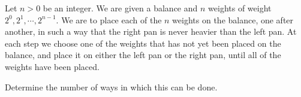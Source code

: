 Let 
$n > 0$
 be an integer. We are given a balance and 
$n$
 weights of weight 
$2^0, 2^1, \cdots, 2^{n-1}$.
 We are to place each of the 
$n$
 weights on the balance, one after another, in such a way that the right pan is never heavier than the left pan. At each step we choose one of the weights that has not yet been placed on the balance, and place it on either the left pan or the right pan, until all of the weights have been placed.


Determine the number of ways in which this can be done.
